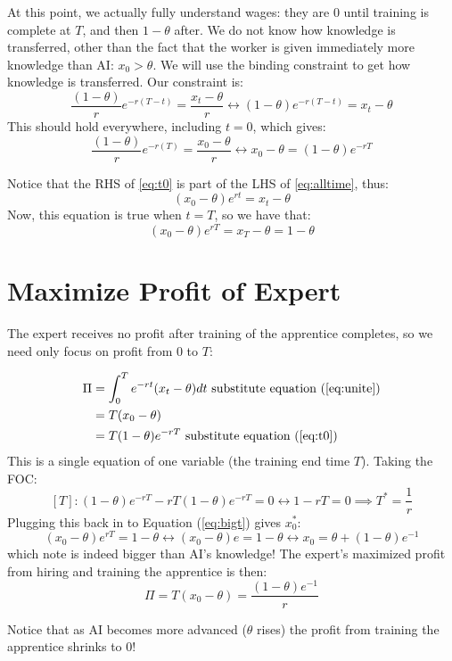 \documentclass{article}
\begin{document}
At this point, we actually fully understand wages: they are $0$ until training is complete at $T$, and then $1-\theta$ after. We do not know how knowledge is transferred, other than the fact that the worker is given immediately more knowledge than AI: $x_0>\theta$. We will use the binding constraint to get how knowledge is transferred. Our constraint is:
\begin{equation}
    \frac{(1-\theta)}{r}e^{-r(T-t)} = \frac{x_t-\theta}{r} \leftrightarrow (1-\theta)e^{-r(T-t)} = x_t-\theta\label{eq:alltime}
\end{equation}
This should hold everywhere, including $t=0$, which gives:
\begin{equation}
    \frac{(1-\theta)}{r}e^{-r(T)} = \frac{x_0-\theta}{r} \leftrightarrow x_0-\theta= (1-\theta) e^{-rT} \label{eq:t0}
\end{equation}

Notice that the RHS of \ref{eq:t0} is part of the LHS of \ref{eq:alltime}, thus:
\begin{equation}
     (x_0-\theta) e^{rt}=x_t-\theta  \label{eq:unite}
\end{equation}
Now, this equation is true when $t=T$, so we have that:
\begin{equation}
     (x_0-\theta) e^{rT}=x_T-\theta=1-\theta  \label{eq:bigt}
\end{equation}

\section{Maximize Profit of Expert}

The expert receives no profit after training of the apprentice completes, so we need only focus on profit from $0$ to $T$:

\begin{align}
\Pi &= \int_0^T e^{-rt} (x_t-\theta) dt \text{ substitute equation (\ref{eq:unite})}\\
&= T(x_0-\theta)\\
&= T(1-\theta)e^{-rT} \text{ substitute equation (\ref{eq:t0})}
\end{align}
This is a single equation of one variable (the training end time $T$). Taking the FOC:
\[[T]: (1-\theta) e^{-rT} -rT(1-\theta) e^{-rT}=0 \leftrightarrow 1-rT=0 \implies T^*=\frac{1}{r} \]
Plugging this back in to Equation (\ref{eq:bigt}) gives $x_0^*$:
\[(x_0-\theta)e^{rT} = 1-\theta \leftrightarrow (x_0-\theta)e = 1-\theta \leftrightarrow x_0 = \theta +(1-\theta)e^{-1} \]
which note is indeed bigger than AI's knowledge! The expert's maximized profit from hiring and training the apprentice is then:
\[\Pi = T(x_0-\theta) = \frac{(1-\theta)e^{-1}}{r} \]

Notice that as AI becomes more advanced ($\theta$ rises) the profit from training the apprentice shrinks to 0!
\end{document}

